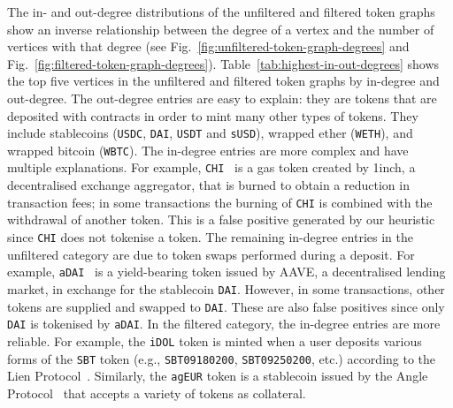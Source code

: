 The in- and out-degree distributions of the unfiltered and filtered
token graphs show an inverse relationship between the degree of a
vertex and the number of vertices with that degree (see
Fig.~\ref{fig:unfiltered-token-graph-degrees} and
Fig.~\ref{fig:filtered-token-graph-degrees}).
Table~\ref{tab:highest-in-out-degrees} shows the top five vertices in
the unfiltered and filtered token graphs by in-degree and out-degree.
The out-degree entries are easy to explain: they are tokens that are
deposited with contracts in order to mint many other types of tokens.
They include stablecoins (\texttt{USDC}, \texttt{DAI}, \texttt{USDT}
and \texttt{sUSD}), wrapped ether (\texttt{WETH}), and wrapped bitcoin
(\texttt{WBTC}).  The in-degree entries are more complex and have
multiple explanations.  For example, \texttt{CHI}~\cite{1inch-20} is a
gas token created by 1inch, a decentralised exchange aggregator, that
is burned to obtain a reduction in transaction fees; in some
transactions the burning of \texttt{CHI} is combined with the
withdrawal of another token.  This is a false positive generated by
our heuristic since \texttt{CHI} does not tokenise a token.  The
remaining in-degree entries in the unfiltered category are due to
token swaps performed during a deposit.  For example,
\texttt{aDAI}~\cite{aave-xx} is a yield-bearing token issued by AAVE,
a decentralised lending market, in exchange for the stablecoin
\texttt{DAI}.  However, in some transactions, other tokens are
supplied and swapped to \texttt{DAI}.  These are also false positives
since only \texttt{DAI} is tokenised by \texttt{aDAI}.  In the
filtered category, the in-degree entries are more reliable.  For
example, the \texttt{iDOL} token is minted when a user deposits
various forms of the \texttt{SBT} token (e.g., \texttt{SBT09180200},
\texttt{SBT09250200}, etc.) according to the Lien
Protocol~\cite{lien-20}.  Similarly, the \texttt{agEUR} token is a
stablecoin issued by the Angle Protocol~\cite{angle-xx} that accepts a
variety of tokens as collateral.

